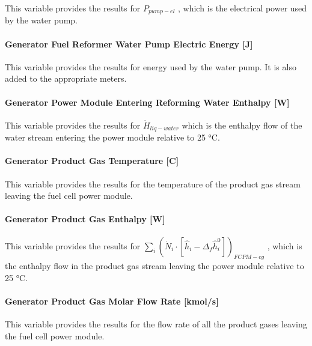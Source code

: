 This variable provides the results for \({P_{pump - el}}\) , which is the electrical power used by the water pump.

\paragraph{Generator Fuel Reformer Water Pump Electric Energy {[}J{]}}\label{generator-fuel-reformer-water-pump-electric-energy-j}

This variable provides the results for energy used by the water pump. It is also added to the appropriate meters.

\paragraph{Generator Power Module Entering Reforming Water Enthalpy {[}W{]}}\label{generator-power-module-entering-reforming-water-enthalpy-w}

This variable provides the results for \({\dot H_{liq - water}}\) which is the enthalpy flow of the water stream entering the power module relative to 25 °C.

\paragraph{Generator Product Gas Temperature {[}C{]}}\label{generator-product-gas-temperature-c}

This variable provides the results for the temperature of the product gas stream leaving the fuel cell power module.

\paragraph{Generator Product Gas Enthalpy {[}W{]}}\label{generator-product-gas-enthalpy-w}

This variable provides the results for \({\sum\limits_i {\left( {{{\dot N}_i} \cdot \left[ {{{\hat h}_i} - {\Delta_f}\hat h_i^0} \right]} \right)}_{FCPM - cg}}\) , which is the enthalpy flow in the product gas stream leaving the power module relative to 25 °C.

\paragraph{Generator Product Gas Molar Flow Rate {[}kmol/s{]}}\label{generator-product-gas-molar-flow-rate-kmols}

This variable provides the results for the flow rate of all the product gases leaving the fuel cell power module.


